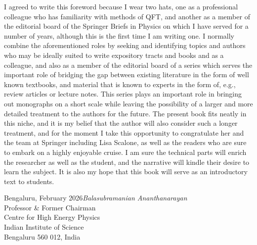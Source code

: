 I agreed to write this foreword because I wear two hats, one as a professional colleague who has familiarity with methods of QFT,
and another as a member of the editorial board of the Springer Briefs in Physics on which
I have served for a number of years, although this is the first time I am writing one.  I normally
combine the aforementioned roles by seeking and identifying topics and authors who may be
ideally suited to write expository tracts and books and as a colleague, and also as a member
of the editorial board of a series which serves the important role of bridging the gap between
existing literature in the form of well known textbooks, and material that is known to experts
in the form of, e.g., review articles or lecture notes.  This series plays an important role in 
bringing out monographs on a short scale while leaving the possibility of a larger and more
detailed treatment to the authors for the future.  The present book fits neatly in this niche,
and it is my belief that the author will also consider such a longer treatment, and for the
moment I take this opportunity to congratulate her and the team at Springer including
Lisa Scalone, as well as the readers who are sure to embark on a highly enjoyable cruise.
I am sure the technical parts will enrich the researcher as well as the student, and the
narrative will kindle their desire to learn the subject.  It is also my hope that this book will serve
as an introductory text to students.





\vspace{\baselineskip}
\begin{flushright}\noindent
Bengaluru, February 2026\hfill {\it Balasubramanian Ananthanarayan}\\
\hfill{Professor \& Former Chairman}
\\\hfill{Centre for High Energy Physics}
\\\hfill{Indian Institute of Science}
\\\hfill{Bengaluru 560 012, India}

\end{flushright}



